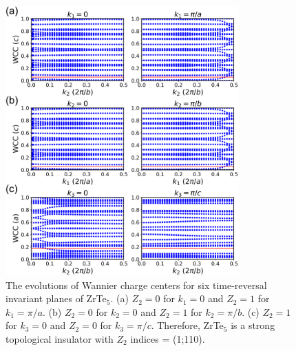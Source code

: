 	\begin{figure}[htbp]
        \centering
        \captionsetup{singlelinecheck = false, justification=justified}
        \includegraphics[width=0.8\textwidth]{ZrTe5_wcc.png}
        \caption[The evolutions of Wannier charge centers for six time-reversal invariant planes of ZrTe$_5$]{The evolutions of Wannier charge centers for six time-reversal invariant planes of ZrTe$_5$. (a) $Z_2=0$ for $k_1=0$ and $Z_2=1$ for $k_1=\pi/a$. (b) $Z_2=0$ for $k_2=0$ and $Z_2=1$ for $k_2=\pi/b$. (c) $Z_2=1$ for $k_3=0$ and $Z_2=0$ for $k_3=\pi/c$. Therefore, ZrTe$_5$ is a strong topological insulator with $Z_2$ indices = (1;110).}
        \label{ZrTe5_wcc}
    \end{figure}



